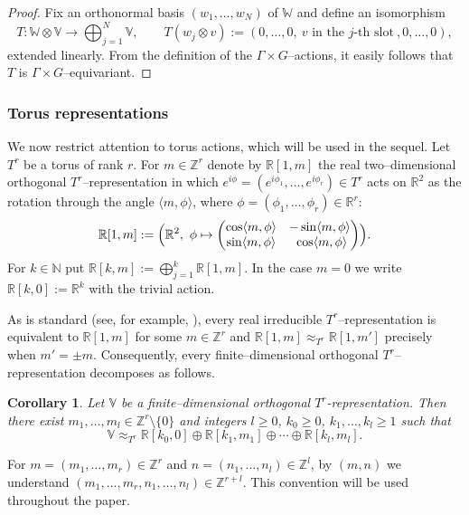\documentclass[reqno,twoside,12pt]{amsart}
\newtheorem{Corollary}[Remark]{Corollary}
\newcommand{\bR}{\mathbb{R}}
\newcommand{\bV}{\mathbb{V}}
\newcommand{\bW}{\mathbb{W}}
\newcommand{\bZ}{\mathbb{Z}}
\numberwithin{equation}{section} \errorcontextlines=0
\begin{document}
\begin{proof}
Fix an orthonormal basis $(w_{1},\dots,w_{N})$ of $\bW$ and define an isomorphism
\[
T: \bW\otimes\bV\longrightarrow \bigoplus_{j=1}^{N}\bV,\qquad
T(w_{j}\otimes v):=(0,\dots,0,\ \text{$v$ in the $j$-th slot}\ ,0,\dots,0),
\]
extended linearly. From the definition of the $\Gamma\times G$–actions,
it easily follows that $T$ is $\Gamma\times G$–equivariant.
\end{proof}




\subsubsection{Torus representations}
We now restrict attention to torus actions, which will be used in the sequel.
Let $T^{r}$ be a torus of rank $r$. For $m\in\mathbb{Z}^{r}$ denote by $\bR[1,m]$ the real two--dimensional orthogonal $T^{r}$--representation in which
$e^{i\phi}=(e^{i\phi_1},\dots,e^{i\phi_r})\in T^r$ acts on $\mathbb{R}^{2}$ as the rotation through the angle $\langle m,\phi\rangle$, where $\phi=(\phi_1,\dots,\phi_r)\in\mathbb{R}^{r}$:
\[
\bR[1,m]:=\Bigl(\mathbb{R}^{2},\ \phi\mapsto
\begin{pmatrix}
\cos\langle m,\phi\rangle & -\sin\langle m,\phi\rangle\\
\sin\langle m,\phi\rangle & \ \cos\langle m,\phi\rangle
\end{pmatrix}\Bigr).
\]
For $k\in\mathbb{N}$ put $\bR[k,m]:=\bigoplus_{j=1}^{k}\bR[1,m]$. In the case $m=0$ we write $\bR[k,0]:=\mathbb{R}^{k}$ with the trivial action.

As is standard (see, for example, \cite[Proposition~II.8.5]{BrockerDieck}), every real irreducible $T^r$–rep\-re\-sen\-tation is equivalent to $\bR[1,m]$ for some $m\in\mathbb{Z}^r$ and $\bR[1,m]\approx_{T^r}\bR[1,m']$ precisely when $m'=\pm m$.
Consequently, every finite–dimensional orthogonal $T^r$–representation decomposes as follows.

\begin{Corollary}\label{cor:repT}
Let $\bV$ be a finite–dimensional orthogonal $T^r$-representation. Then there exist $m_1,\dots,m_l\in \mathbb{Z}^r\setminus\{0\}$ and integers $l\ge 0$, $k_0\ge 0$, $k_1,\dots,k_l\ge 1$ such that
\[
\bV \approx_{T^r} \bR[k_0,0] \oplus \bR[k_1,m_1] \oplus \cdots \oplus \bR[k_l,m_l].
\]
\end{Corollary}

For  $m=(m_1,\dots,m_r)\in\bZ^{r}$ and $n=(n_1,\dots,n_l)\in\bZ^{l}$, by $(m,n)$ we understand $(m_1,\dots,m_r,n_1,\dots,n_l)\in\bZ^{r+l}$. This convention will be used throughout the paper.
\end{document}

